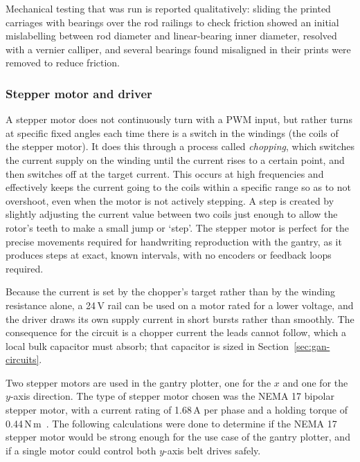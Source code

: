 Mechanical testing that was run is reported qualitatively: sliding the printed carriages with bearings over the rod railings to check friction showed an initial mislabelling between rod diameter and linear-bearing inner diameter, resolved with a vernier calliper, and several bearings found misaligned in their prints were removed to reduce friction.

\subsubsection{Stepper motor and driver}
\label{sec:gan-motor}
\label{sec:gan-components}
\label{sec:gan-supply}

A stepper motor does not continuously turn with a PWM input, but rather turns at specific fixed angles each time there is a switch in the windings (the coils of the stepper motor). It does this through a process called \emph{chopping}, which switches the current supply on the winding until the current rises to a certain point, and then switches off at the target current. This occurs at high frequencies and effectively keeps the current going to the coils within a specific range so as to not overshoot, even when the motor is not actively stepping. A step is created by slightly adjusting the current value between two coils just enough to allow the rotor's teeth to make a small jump or `step'. The stepper motor is perfect for the precise movements required for handwriting reproduction with the gantry, as it produces steps at exact, known intervals, with no encoders or feedback loops required.

Because the current is set by the chopper's target rather than by the winding resistance alone, a 24\,V rail can be used on a motor rated for a lower voltage, and the driver draws its own supply current in short bursts rather than smoothly. The consequence for the circuit is a chopper current the leads cannot follow, which a local bulk capacitor must absorb; that capacitor is sized in Section~\ref{sec:gan-circuits}.

Two stepper motors are used in the gantry plotter, one for the $x$ and one for the $y$-axis direction. The type of stepper motor chosen was the NEMA 17 bipolar stepper motor, with a current rating of 1.68\,A per phase and a holding torque of 0.44\,N\,m~\cite{stepperds}. The following calculations were done to determine if the NEMA 17 stepper motor would be strong enough for the use case of the gantry plotter, and if a single motor could control both $y$-axis belt drives safely.

